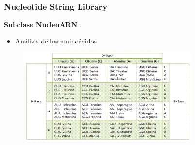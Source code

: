 \documentclass{beamer}
\begin{document}
\begin{frame}
\frametitle{Nucleotide String Library}
\textbf{\large{Subclase NucleoARN :}}
\begin{itemize}
\item{An\'alisis de los amino\'acidos }
\end{itemize}
\begin{figure}
		\includegraphics[width=3.6in]{images1.png}
\end{figure}
\end{frame}
\end{document}
